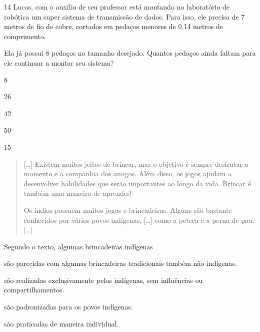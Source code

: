 \num{14} Lucas, com o auxílio de seu professor está montando no
laboratório de robótica um super sistema de transmissão de dados.
Para isso, ele precisa de 7 metros de fio de cobre, cortados em 
pedaços menores de 0,14 metros de comprimento.

Ela já possui 8 pedaços no tamanho desejado. Quantos pedaços ainda
faltam para ele continuar a montar seu sistema?

\begin{minipage}{.5\textwidth}
\begin{escolha}
\item
  8
\item
  26
\item
  42
\item
  50
\end{escolha}
\end{minipage}



\num{15}
\begin{quote}
  {[}\ldots{}{]} Existem muitos jeitos de brincar, mas o objetivo é sempre desfrutar o
  momento e a companhia dos amigos. Além disso, os jogos ajudam a
  desenvolver habilidades que serão importantes ao longo da vida.
  Brincar é também uma maneira de aprender!

Os índios possuem muitos jogos e brincadeiras. Alguns são bastante
conhecidos por vários povos indígenas, {[}\ldots{}{]} como a peteca e a perna
de pau. {[}\ldots{}{]}
\end{quote}


\noindent{}Segundo o texto, algumas brincadeiras indígenas

\begin{escolha}
\item são parecidas com algumas brincadeiras tradicionais também não indígenas.

\item são realizadas exclusivamente pelos indígenas, sem influências ou compartilhamentos.

\item são padronizadas para os povos indígenas.

\item são praticadas de maneira individual.
\end{escolha}



